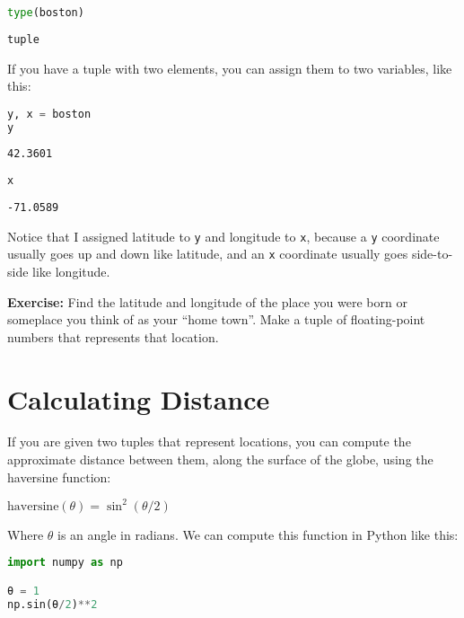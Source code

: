\begin{lstlisting}[language=Python,style=source]
type(boston)
\end{lstlisting}

\begin{lstlisting}[style=output]
tuple
\end{lstlisting}

If you have a tuple with two elements, you can assign them to two
variables, like this:

\begin{lstlisting}[language=Python,style=source]
y, x = boston
y
\end{lstlisting}

\begin{lstlisting}[style=output]
42.3601
\end{lstlisting}

\begin{lstlisting}[language=Python,style=source]
x
\end{lstlisting}

\begin{lstlisting}[style=output]
-71.0589
\end{lstlisting}

Notice that I assigned latitude to \passthrough{\lstinline!y!} and
longitude to \passthrough{\lstinline!x!}, because a
\passthrough{\lstinline!y!} coordinate usually goes up and down like
latitude, and an \passthrough{\lstinline!x!} coordinate usually goes
side-to-side like longitude.

\textbf{Exercise:} Find the latitude and longitude of the place you were
born or someplace you think of as your ``home town''. Make a tuple of
floating-point numbers that represents that location.

\hypertarget{calculating-distance}{%
\section{Calculating Distance}\label{calculating-distance}}

If you are given two tuples that represent locations, you can compute
the approximate distance between them, along the surface of the globe,
using the haversine function:

\(\mathrm{haversine}(\theta)=\sin^2(\theta/2)\)

Where \(\theta\) is an angle in radians. We can compute this function in
Python like this:

\begin{lstlisting}[language=Python,style=source]
import numpy as np

θ = 1
np.sin(θ/2)**2
\end{lstlisting}

